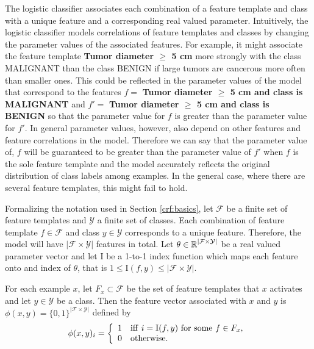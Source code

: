 The logistic classifier associates each combination of a feature
template and class with a unique feature and a corresponding real
valued parameter. Intuitively, the logistic classifier models
correlations of feature templates and classes by changing the
parameter values of the associated features. For example, it might
associate the feature template {\bf Tumor diameter $\geq$ 5 cm} more
strongly with the class MALIGNANT than the class BENIGN if large
tumors are cancerous more often than smaller ones. This could be
reflected in the parameter values of the model that correspond to the
features $f =$ {\bf Tumor diameter $\geq$ 5 cm and class is MALIGNANT}
and $f' =$ {\bf Tumor diameter $\geq$ 5 cm and class is BENIGN} so
that the parameter value for $f$ is greater than the parameter value
for $f'$. In general parameter values, however, also depend on other
features and feature correlations in the model. Therefore we can say
that the parameter value of, $f$ will be guaranteed to be greater than
the parameter value of $f'$ when $f$ is the sole feature template and
the model accurately reflects the original distribution of class
labels among examples. In the general case, where there are several
feature templates, this might fail to hold.

Formalizing the notation used in Section \ref{crf:basics}, let $\mathcal{F}$ be
a finite set of feature templates and $\mathcal{Y}$ a finite set of
classes. Each combination of feature template $f \in \mathcal{F}$ and class $y
\in \mathcal{Y}$ corresponds to a unique feature. Therefore, the model will have
$|\mathcal{F} \times \mathcal{Y}|$ features in total. Let $\theta \in \mbox{$\mathbb R$}^{|\mathcal{F} \times \mathcal{Y}|}$ be a real valued
parameter vector and let ${\mathrm I}$ be a
1-to-1 index function which maps each feature onto and index of $\theta$, that is $1 \leq {\mathrm I}(f,
y) \leq |\mathcal{F} \times \mathcal{Y}|$.

For each example $x$, let $F_x \subset \mathcal{F}$ be the set of feature templates that $x$ activates and let $y \in \mathcal{Y}$ be a class. Then the feature vector associated with $x$ and $y$ is $\phi(x,y) = \{0, 1\}^{|\mathcal{F} \times \mathcal{Y}|}$ defined by
\[
  \phi(x,y)_i = \left\{
  \begin{array}{ll}
  1 & {\rm iff\ } i = {\mathrm I}(f,y) {\rm\ for\ some\ }f \in F_x{\rm,} \\ 
  0 & {\rm otherwise.}  
  \end{array}
  \right.
\]


